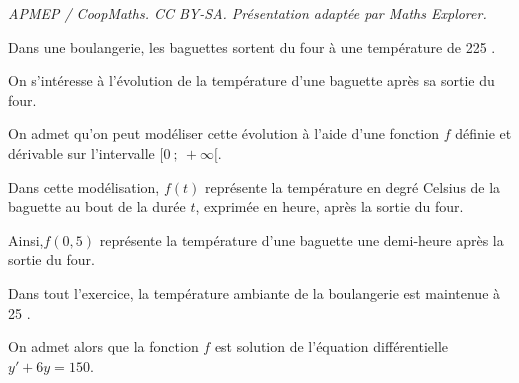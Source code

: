 \documentclass[10pt]{article}
\begin{document}
\noindent\textit{APMEP / CoopMaths. CC BY-SA. Présentation adaptée par Maths Explorer.}\par\medskip
\medskip


\medskip

Dans une boulangerie, les baguettes sortent du four à une température de 225 \textcelsius.

On s’intéresse à l’évolution de la température d’une baguette après sa sortie du four.

On admet qu’on peut modéliser cette évolution à l’aide d’une fonction $f$ définie et dérivable sur l’intervalle $[0~;~+\infty[$.

 Dans cette modélisation, $f(t)$ représente la température en degré Celsius de la baguette au bout de la durée $t$, exprimée en heure, après la sortie du four.

Ainsi,$f(0,5)$ représente la température d’une baguette une demi-heure après la sortie du four.

Dans tout l’exercice, la température ambiante de la boulangerie est maintenue à 25 \textcelsius.

On admet alors que la fonction $f$ est solution de l'équation différentielle $y'+ 6y = 150$.

\medskip
\end{document}
